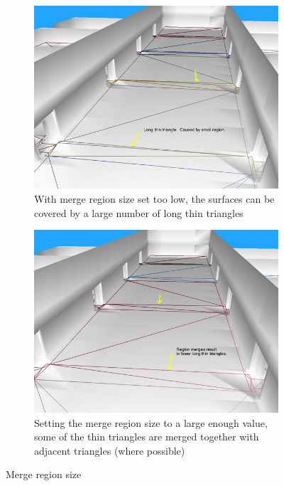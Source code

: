 \begin{itemize}
  
  \begin{figure}[H]
        \centering
        \begin{subfigure}[b]{0.49\textwidth}
                \centering
                \includegraphics[width=\textwidth]{../images/merge_region_0.png}
                \caption{With merge region size set too low, the surfaces can be covered by a large number of long thin triangles}
        \end{subfigure}
        \begin{subfigure}[b]{0.49\textwidth}
                \centering
                \includegraphics[width=\textwidth]{../images/merge_region_1.png}
                \caption{Setting the merge region size to a large enough value, some of the thin triangles are merged together with adjacent triangles (where possible)}
        \end{subfigure}
        \caption{Merge region size}
	\end{figure}  
  

\end{itemize}
